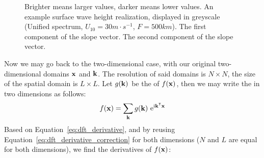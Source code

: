 \begin{figure}
{ }
 \hfill
\caption{Brighter means larger values, darker means lower values.
 An example
surface wave height realization, displayed in greyscale (Unified spectrum, 
$U_{10}=30m\cdot s^{-1}$, $F=500km$).  The 
first component of the slope vector.  The 
second component of the slope vector.
}
\label{fig:derivatives}
\end{figure}
%
Now we may go back to the two-dimensional case, with our original two-dimensional
domains $\mathbf{x}$ and $\mathbf{k}$. The resolution of said domains is $N \times N$,
the size of the spatial domain is $L \times L$. Let $g(\mathbf{k})$ be the
\DiscreteFourierTransform of $f(\mathbf{x})$, then we may write the
\InvDiscreteFourierTransform in two dimensions as follows:
\begin{equation*}
 f(\mathbf{x}) = \sum_{\mathbf{k}}g(\mathbf{k})~\mathrm{e}^{\mathrm{i}\mathbf{k}^{\mathsf{T}}\mathbf{x}}
\end{equation*}
Based on Equation~\ref{eq:dft_derivative}, and by reusing Equation~\ref{eq:dft_derivative_correction}
for both dimensions ($N$ and $L$ are equal for both dimensions), we find the derivatives of $f(\mathbf{x})$:
